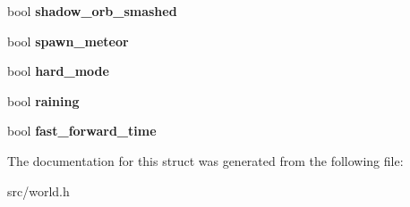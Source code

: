 \begin{DoxyCompactItemize}
\item 
\hypertarget{structworld__flags_a9b5b8f33f7120fa5f793b4b86e71f86f}{}bool {\bfseries shadow\+\_\+orb\+\_\+smashed}\label{structworld__flags_a9b5b8f33f7120fa5f793b4b86e71f86f}

\item 
\hypertarget{structworld__flags_a9428564d6052ac44e4bab39d2de402f7}{}bool {\bfseries spawn\+\_\+meteor}\label{structworld__flags_a9428564d6052ac44e4bab39d2de402f7}

\item 
\hypertarget{structworld__flags_ab364d10210e2243a6b121be93e024cbe}{}bool {\bfseries hard\+\_\+mode}\label{structworld__flags_ab364d10210e2243a6b121be93e024cbe}

\item 
\hypertarget{structworld__flags_add20b9a7ba48e6f24ebd040bd0fb695f}{}bool {\bfseries raining}\label{structworld__flags_add20b9a7ba48e6f24ebd040bd0fb695f}

\item 
\hypertarget{structworld__flags_adb7d017a779ddba45ba6ea5f71cdc62f}{}bool {\bfseries fast\+\_\+forward\+\_\+time}\label{structworld__flags_adb7d017a779ddba45ba6ea5f71cdc62f}

\end{DoxyCompactItemize}


The documentation for this struct was generated from the following file\+:\begin{DoxyCompactItemize}
\item 
src/world.\+h\end{DoxyCompactItemize}
